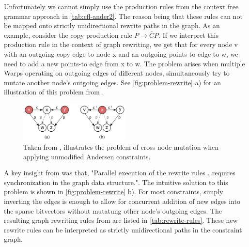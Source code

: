 Unfortunately we cannot simply use the production rules from the context free grammar approach in \autoref{tab:cfl-ander2}. The reason being that these rules can not be mapped onto strictly unidirectional rewrite paths in the graph.
As an example, consider the copy production rule $P\rightarrow \bar{C}P$. If we interpret this production rule in the context of graph rewriting, we get that for every node v with an outgoing copy edge to node x and an outgoing points-to edge to w, we need to add a new points-to edge from x to w.
The problem arises when multiple Warps operating on outgoing edges of different nodes, simultaneously try to mutate another node's outgoing edges.
See \autoref{fig:problem-rewrite} a) for an illustration of this problem from \cite{mendez2012gpu}.
\begin{figure}
    \centering
    \includegraphics[width=0.5\textwidth]{img/rewriting-concurrent.png}
    \caption[Diagram for Concurrent Graph Rewriting]{Taken from \cite{mendez2012gpu}, illustrates the problem of cross node mutation when applying unmodified Andersen constraints.}
    \label{fig:problem-rewrite}
\end{figure}
A key insight from \cite{mendez2012gpu} was that, "Parallel execution of the rewrite rules \dots requires synchronization in the graph data structure.".
The intuitive solution to this problem is shown in \autoref{fig:problem-rewrite} b). For most constraints, simply inverting the edges is enough to allow for concurrent addition of new edges into the sparse bitvectors without mutatung other node's outgoing edges.
The resulting graph rewriting rules from \cite{mendez2012gpu} are listed in \autoref{tab:rewrite-rules}. These new rewrite rules can be interpreted as strictly unidirectional paths in the constraint graph.
